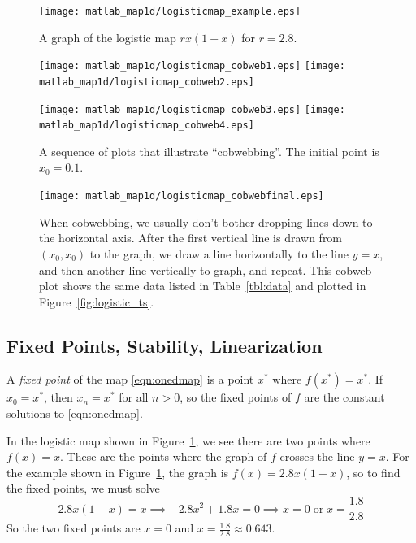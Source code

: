 \documentclass[reqno]{immbook}
\numberwithin{equation}{chapter}
\numberwithin{question}{section}
\numberwithin{theorem}{chapter}
\numberwithin{figure}{chapter}
\theoremstyle{definition}
\begin{document}
\begin{figure}
\centerline{\texttt{[image: matlab\_map1d/logisticmap\_example.eps]}}
\caption{A graph of the logistic map $rx(1-x)$ for $r=2.8$.}
\label{fig:logisticmap_example}
\end{figure}
%
\begin{figure}
\centerline{%
\texttt{[image: matlab\_map1d/logisticmap\_cobweb1.eps]}
\texttt{[image: matlab\_map1d/logisticmap\_cobweb2.eps]}
}
\centerline{%
\texttt{[image: matlab\_map1d/logisticmap\_cobweb3.eps]}
\texttt{[image: matlab\_map1d/logisticmap\_cobweb4.eps]}
}
\caption{A sequence of plots that illustrate
``cobwebbing''. The initial point is $x_0=0.1$.}
\label{fig:cobwebsequence}
\end{figure}
%
\begin{figure}
\centerline{%
\texttt{[image: matlab\_map1d/logisticmap\_cobwebfinal.eps]}
}
\caption{When cobwebbing, we usually don't bother dropping
lines down to the horizontal axis. After the first vertical
line is drawn from $(x_0,x_0)$ to the graph, we draw
a line horizontally to the line
$y=x$, and then another line vertically to graph, and repeat.
This cobweb plot shows
the same data listed in Table~\ref{tbl:data} and plotted in
Figure~\ref{fig:logistic_ts}.}
\label{fig:cobwebfinal} 
\end{figure}
%


%
\subsection*{Fixed Points, Stability, Linearization}
A \emph{fixed point} of the map \eqref{eqn:onedmap}
is a point $x^*$ where $f(x^*)=x^*$.
If $x_0=x^*$, then $x_n=x^*$ for all $n>0$, so the fixed points
of $f$ are the constant solutions to \eqref{eqn:onedmap}.

In the logistic map shown in Figure~\ref{fig:logisticmap_example},
we see there are two
points where $f(x)=x$.  These are the points
where the graph of $f$ crosses the line $y=x$.
For the example shown in Figure~\ref{fig:logisticmap_example},
the graph is $f(x) = 2.8x(1-x)$, so to find the fixed points,
we must solve
\begin{equation}
  2.8x(1-x) = x \implies -2.8x^2 + 1.8x = 0
  \implies x = 0 \;\textrm{or}\; x = \frac{1.8}{2.8}
\end{equation}
So the two fixed points are $x=0$ and $x=\frac{1.8}{2.8}\approx 0.643$.
\end{document}
